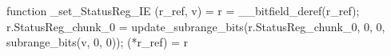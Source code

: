function _set_StatusReg_IE (r_ref, v) = {
    r = __bitfield_deref(r_ref);
    r.StatusReg_chunk_0 = update_subrange_bits(r.StatusReg_chunk_0, 0, 0, subrange_bits(v, 0, 0));
    (*r_ref) = r
}
